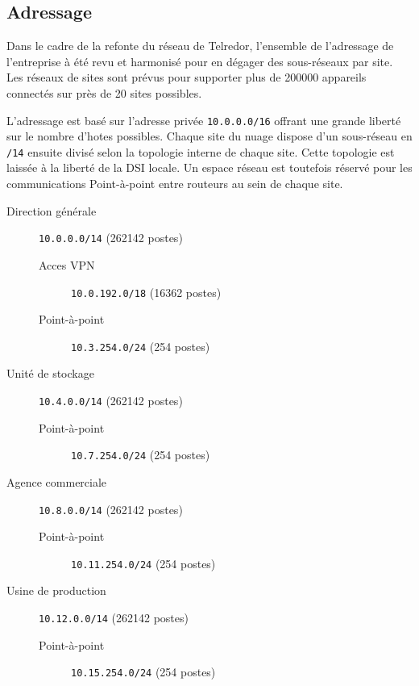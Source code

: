 \documentclass{article}
\newcommand{\tlr}{Telredor\xspace}
\begin{document}
\subsection{Adressage}

Dans le cadre de la refonte du réseau de \tlr, l'ensemble de l'adressage de l'entreprise à été revu et harmonisé pour en dégager des sous-réseaux par site.
Les réseaux de sites sont prévus pour supporter plus de 200000 appareils connectés sur près de 20 sites possibles.

L'adressage est basé sur l'adresse privée \texttt{10.0.0.0/16} offrant une grande liberté sur le nombre d'hotes possibles.
Chaque site du nuage dispose d'un sous-réseau en \texttt{/14} ensuite divisé selon la topologie interne de chaque site.
Cette topologie est laissée à la liberté de la DSI locale.
Un espace réseau est toutefois réservé pour les communications Point-à-point entre routeurs au sein de chaque site.

\bigskip

\begin{description}
	\item[Direction générale] \texttt{10.0.0.0/14} (262142 postes)
	\begin{description}
		\item[Acces VPN] \texttt{10.0.192.0/18} (16362 postes)
		\item[Point-à-point] \texttt{10.3.254.0/24} (254 postes)
	\end{description}
	\item[Unité de stockage] \texttt{10.4.0.0/14} (262142 postes)
	\begin{description}
		\item[Point-à-point] \texttt{10.7.254.0/24} (254 postes)
	\end{description}
	\item[Agence commerciale] \texttt{10.8.0.0/14} (262142 postes)
	\begin{description}
		\item[Point-à-point] \texttt{10.11.254.0/24} (254 postes)
	\end{description}
	\item[Usine de production] \texttt{10.12.0.0/14} (262142 postes)
	\begin{description}
		\item[Point-à-point] \texttt{10.15.254.0/24} (254 postes)
	\end{description}
\end{description}

\bigskip
\end{document}
